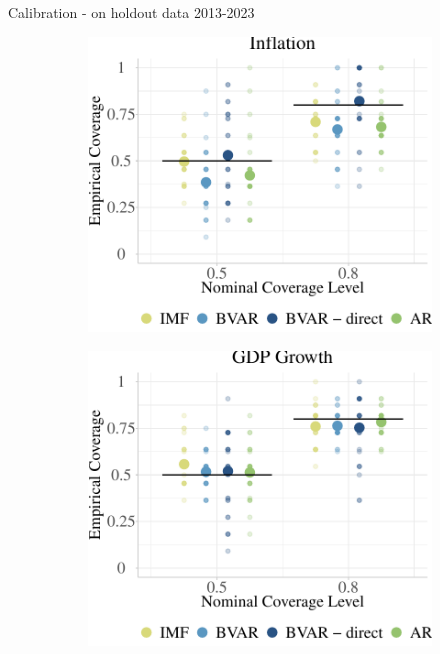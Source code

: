 \documentclass[en]{sdqbeamer}
\begin{document}
\begin{frame}{Calibration - on holdout data 2013-2023}
\begin{figure}
  \begin{subfigure}{0.385\textwidth}
  \centering
    \includegraphics[width=\textwidth]{figures/coverage_pcpi_pch_ho.pdf} %
  \end{subfigure}
  \hspace*{12mm}
  \begin{subfigure}{0.385\textwidth}
  \centering
    \includegraphics[width=\textwidth]{figures/coverage_ngdp_rpch_ho.pdf} %
  \end{subfigure}%
\end{figure}

\end{frame}
\end{document}

